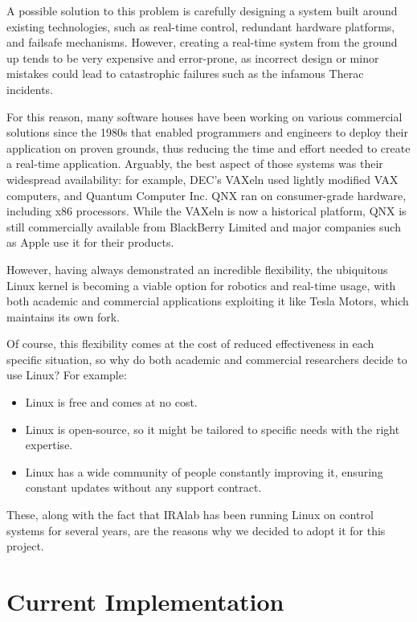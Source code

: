 \documentclass[a4paper,12pt]{report}
\begin{document}
A possible solution to this problem is carefully designing a system built around existing technologies, such as real-time control, redundant hardware platforms, and failsafe mechanisms. However, creating a real-time system from the ground up tends to be very expensive and error-prone, as incorrect design or minor mistakes could lead to catastrophic failures such as the infamous Therac\cite{therac-25-accidents} incidents.

For this reason, many software houses have been working on various commercial solutions since the 1980s that enabled programmers and engineers to deploy their application on proven grounds, thus reducing the time and effort needed to create a real-time application. Arguably, the best aspect of those systems was their widespread availability: for example, DEC's VAXeln used lightly modified VAX computers, and Quantum Computer Inc. QNX ran on consumer-grade hardware, including x86 processors. While the VAXeln is now a historical platform, QNX is still commercially available from BlackBerry Limited and major companies such as Apple use it for their products\cite{time-carplay-qnx}.

However, having always demonstrated an incredible flexibility, the ubiquitous Linux kernel is becoming a viable option for robotics and real-time usage, with both academic and commercial applications exploiting it like Tesla Motors, which maintains its own fork\cite{gh-tesla-linux}.

Of course, this flexibility comes at the cost of reduced effectiveness in each specific situation, so why do both academic and commercial researchers decide to use Linux? For example:
\begin{itemize}
  \item Linux is free and comes at no cost.
  \item Linux is open-source, so it might be tailored to specific needs with the right expertise.
  \item Linux has a wide community of people constantly improving it, ensuring constant updates without any support contract.
\end{itemize}

These, along with the fact that IRAlab has been running Linux on control systems for several years, are the reasons why we decided to adopt it for this project.

\section{Current Implementation}
\end{document}
